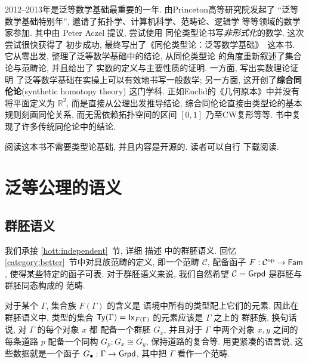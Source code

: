 2012--2013年是泛等数学基础最重要的一年. 由Princeton高等研究院发起了
“泛等数学基础特别年”, 邀请了拓扑学、计算机科学、范畴论、逻辑学
等等领域的数学家参加. 其中由 Peter Aczel 提议, 尝试使用
同伦类型论书写\emph{非形式化}的数学. 这次尝试很快获得了
初步成功, 最终写出了《同伦类型论：泛等数学基础》~\cite{ufp:2013:hottbook}这本书.
它从零出发, 整理了泛等数学基础中的结论, 从同伦类型论
的角度重新叙述了集合论与范畴论, 并且给出了
实数的定义与主要性质的证明. 一方面, 写出实数理论证明
了泛等数学基础在实操上可以有效地书写一般数学; 另一方面,
这开创了\textbf{综合同伦论}(synthetic homotopy theory)
这门学科. 正如Euclid的《几何原本》中并没有将平面定义为
\(\mathbb R^2\), 而是直接从公理出发推导结论,
综合同伦论直接由类型论的基本规则刻画同伦关系,
而无需依赖拓扑空间的区间 \([0,1]\) 乃至CW复形等等.
书中复现了许多传统同伦论中的结论.

阅读这本书不需要类型论基础, 并且内容是开源的. 读者可以自行
下载阅读.

\section{泛等公理的语义}
\label{hott:semantics}

\subsection[群胚语义]{群胚语义\protect{}}
我们承接 \ref{hott:independent}~节, 详细
描述 \cite{hofmann:1998:groupoid} 中的群胚语义.
回忆 \ref{category:better}~节中对具族范畴的定义,
即一个范畴 \(\mathcal C\), 配备函子
\(F : \mathcal C^{\textrm{op}}\to \textnormal{\textsf{Fam}}\),
使得某些特定的函子可表. 对于群胚语义来说, 我们自然希望
\(\mathcal C = \textnormal{\textsf{Grpd}}\) 是群胚与群胚同态构成的
范畴.

对于某个 \(\Gamma\), 集合族 \(F(\Gamma)\) 的含义是
语境中所有的类型配上它们的元素. 因此在群胚语义中, 类型的集合
\(\textnormal{\textsf{Ty}}(\Gamma) = \textnormal{\textsf{Ix}}_{F(\Gamma)}\) 的元素应该是 \(\Gamma\) 之上的
群胚族. 换句话说, 对 \(\Gamma\) 的每个对象 \(x\) 都
配备一个群胚 \(G_x\), 并且对于 \(\Gamma\) 中两个对象
\(x,y\) 之间的每条道路 \(p\) 配备一个同构 \(G_p : G_x \cong G_y\),
保持道路的复合等. 用更紧凑的语言说, 这些数据就是一个函子
\(G_\bullet : \Gamma \to \textnormal{\textsf{Grpd}}\), 其中把 \(\Gamma\)
看作一个范畴.

